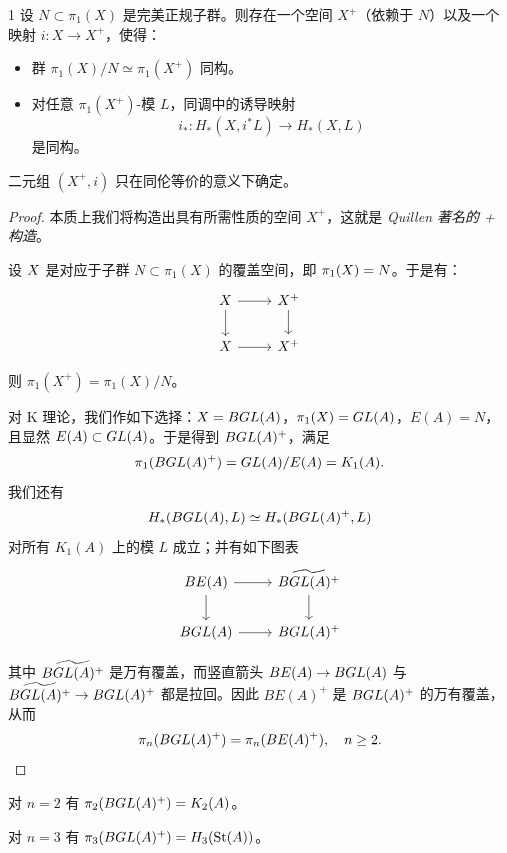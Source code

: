 \begin{thm}{1} 设 $N\subset\pi_1(X)$ 是完美正规子群。则存在一个空间 $X^+$（依赖于 $N$）以及一个映射 $i:X\to X^+$，使得：
\begin{itemize}[leftmargin=1.6em,itemsep=2pt]
\item 群 $\pi_1(X)/N\simeq\pi_1(X^+)$ 同构。
\item 对任意 $\pi_1(X^+)$-模 $L$，同调中的诱导映射
\[ i_*:H_*(X,i^*L)\to H_*(X,L) \]
是同构。
\end{itemize}
\end{thm}

二元组 $(X^+,i)$ 只在同伦等价的意义下确定。

\begin{proof}
本质上我们将构造出具有所需性质的空间 $X^+$，这就是 \emph{Quillen 著名的 + 构造}。

设 $ X$ 是对应于子群 $N\subset\pi_1(X)$ 的覆盖空间，即 $\pi_1( X)=N$。于是有：
\[
\begin{tikzcd}
\wt X \arrow[r] \arrow[d] & \wt X^+ \arrow[d] \\
X \arrow[r] & X^+
\end{tikzcd}
\]

则 $\pi_1(X^+)=\pi_1(X)/N$。

对 K 理论，我们作如下选择：$X=BGL(A)$，$\pi_1(X)=GL(A)$，$E(A)=N$，且显然 $E(A)\subset GL(A)$。于是得到 $BGL(A)^+$，满足
\[ \pi_1(BGL(A)^+)=GL(A)/E(A)=K_1(A). \]
我们还有
\[ H_*(BGL(A),L)\simeq H_*(BGL(A)^+,L) \]
对所有 $K_1(A)$ 上的模 $L$ 成立；并有如下图表
\[
\begin{tikzcd}
BE(A) \arrow[r] \arrow[d] & \widetilde{B\GL(A)^+} \arrow[d] \\
B\GL(A) \arrow[r] & B\GL(A)^+
\end{tikzcd}
\]

其中 $\widetilde{BGL(A)^+}$ 是万有覆盖，而竖直箭头 $BE(A)\to BGL(A)$ 与 $\widetilde{BGL(A)^+}\to BGL(A)^+$ 都是拉回。因此 $BE(A)^+$ 是 $BGL(A)^+$ 的万有覆盖，从而
\[ \pi_n(BGL(A)^+)=\pi_n(BE(A)^+),\quad n\ge 2. \]
\end{proof}

对 $n=2$ 有 $\pi_2(BGL(A)^+)=K_2(A)$。

对 $n=3$ 有 $\pi_3(BGL(A)^+)=H_3(\mathrm{St}(A))$。

